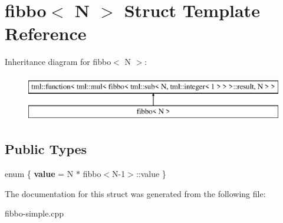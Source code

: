 \hypertarget{structfibbo}{\section{fibbo$<$ N $>$ Struct Template Reference}
\label{structfibbo}
}
Inheritance diagram for fibbo$<$ N $>$\+:\begin{figure}[H]
\begin{center}
\leavevmode
\includegraphics[height=2.000000cm]{structfibbo}
\end{center}
\end{figure}
\subsection*{Public Types}
\begin{DoxyCompactItemize}
\item 
\hypertarget{structfibbo_adb1949b75241855ec3400e232dc4ff1f}{enum \{ {\bfseries value} = N $\ast$ fibbo$<$N-\/1$>$\+:\+:value
 \}}\label{structfibbo_adb1949b75241855ec3400e232dc4ff1f}

\end{DoxyCompactItemize}


The documentation for this struct was generated from the following file\+:\begin{DoxyCompactItemize}
\item 
fibbo-\/simple.\+cpp\end{DoxyCompactItemize}
